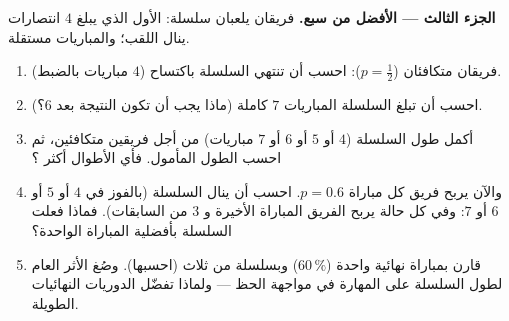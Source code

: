 \begin{problem}
\medskip
\noindent\textbf{الجزء الثالث --- الأفضل من سبع.}
فريقان يلعبان سلسلة: الأول الذي يبلغ $4$ انتصارات ينال اللقب؛
والمباريات مستقلة.
\begin{enumerate}[resume]
  \item فريقان متكافئان ($p = \frac12$): احسب 
        أن تنتهي السلسلة باكتساح ($4$ مباريات بالضبط).
  \item احسب  أن تبلغ السلسلة المباريات
        $7$ كاملة (ماذا يجب أن تكون النتيجة بعد $6$؟).
  \item أكمل  طول السلسلة
        ($4$ أو $5$ أو $6$ أو $7$ مباريات) من أجل فريقين متكافئين، ثم
        احسب الطول المأمول. فأي الأطوال أكثر
        ؟
  \item والآن يربح فريق كل مباراة  $p = 0.6$. احسب
         أن ينال السلسلة (بالفوز في $4$ أو $5$ أو $6$
        أو $7$: وفي كل حالة يربح الفريق المباراة الأخيرة و
        $3$ من السابقات). فماذا فعلت السلسلة
        بأفضلية المباراة الواحدة؟
  \item قارن بمباراة نهائية واحدة ($60\,\%$) وبسلسلة من ثلاث
        (احسبها). وصُغ الأثر العام لطول السلسلة
        على المهارة في مواجهة الحظ --- ولماذا تفضّل الدوريات
        النهائيات الطويلة.
\end{enumerate}


\end{problem}
